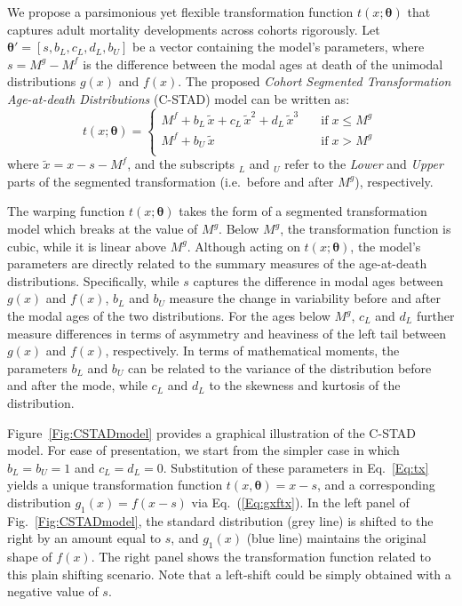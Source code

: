 \documentclass[11pt, a4paper]{article}
\begin{document}
We propose a parsimonious yet flexible transformation function $t(x;\bm{\theta})$ that captures adult mortality developments across cohorts rigorously. Let $\bm{\theta}' = \left[s,b_{L},c_{L},d_{L},b_{U}\right]$ be a vector containing the model's parameters, where $s = M^{g} - M^{f}$ is the difference between the modal ages at death of the unimodal distributions $g(x)$ and $f(x)$. The proposed \emph{Cohort Segmented Transformation Age-at-death Distributions} (C-STAD) model can be written as: 
%
\begin{equation}\label{Eq:tx}
t(x;\bm{\theta}) = \left\{ \begin{array}{ll}
M^{f} + b_{L}\,\tilde{x} + c_{L}\,\tilde{x}^2 + d_{L}\,\tilde{x}^3 \quad & \mathrm{if} \; x \leq M^{g} \, \\
M^{f} + b_{U}\,\tilde{x} \quad & \mathrm{if} \; x > M^{g} \\
\end{array}
\right.
\end{equation} 
%
where $\tilde{x}=x - s - M^{f}$, and the subscripts $_L$ and $_U$ refer to the \textit{Lower} and \textit{Upper} parts of the segmented transformation (i.e.~before and after $M^{g}$), respectively. \par

The warping function $t(x;\bm{\theta})$ takes the form of a segmented transformation model which breaks at the value of $M^{g}$. Below $M^{g}$, the transformation function is cubic, while it is linear above $M^{g}$. Although acting on $t(x;\bm{\theta})$, the model's parameters are directly related to the summary measures of the age-at-death distributions. Specifically, while $s$ captures the difference in modal ages between $g(x)$ and $f(x)$, $b_L$ and $b_U$ measure the change in variability before and after the modal ages of the two distributions. For the ages below $M^{g}$, $c_L$ and $d_L$ further measure differences in terms of asymmetry and heaviness of the left tail between $g(x)$ and $f(x)$, respectively. In terms of mathematical moments, the parameters $b_L$ and $b_U$ can be related to the variance of the distribution before and after the mode, while $c_L$ and $d_L$ to the skewness and kurtosis of the distribution. \par

Figure~\ref{Fig:CSTADmodel} provides a graphical illustration of the C-STAD model. For ease of presentation, we start from the simpler case in which $b_L = b_U = 1$ and $c_L = d_L = 0$. Substitution of these parameters in Eq.~\eqref{Eq:tx} yields a unique transformation function $t(x,\bm{\theta})=x-s$, and a corresponding distribution $g_1(x) = f(x-s)$ via Eq.~(\ref{Eq:gxftx}). In the left panel of Fig.~\ref{Fig:CSTADmodel}, the standard distribution (grey line) is shifted to the right by an amount equal to $s$, and $g_1(x)$ (blue line) maintains the original shape of $f(x)$. The right panel shows the transformation function related to this plain shifting scenario. Note that a left-shift could be simply obtained with a negative value of $s$. \par
\end{document}
